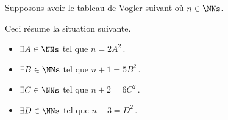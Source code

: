 \begin{example}
	Supposons avoir le tableau de Vogler suivant où $n \in \NNs$.

	\begin{center}
	\end{center}
	
	Ceci résume la situation suivante. 
	
	\begin{itemize}
		\item $\exists A \in \NNs$ tel que $n     = 2 A^2$\,.

		\item $\exists B \in \NNs$ tel que $n + 1 = 5 B^2$\,.

		\item $\exists C \in \NNs$ tel que $n + 2 = 6 C^2$\,.

		\item $\exists D \in \NNs$ tel que $n + 3 = D^2  $\,.
	\end{itemize}
\end{example}




